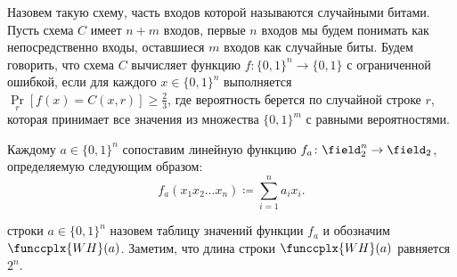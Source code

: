

\setmathstyle{}{}{}
\setcounter{curtask}{95}



\begin{definition*}
    Назовем  такую схему, часть входов которой называются
    случайными битами. Пусть схема $C$ имеет $n + m$ входов, первые $n$ входов мы будем понимать как
    непосредственно входы, оставшиеся $m$ входов как случайные биты. Будем говорить, что схема $C$
    вычисляет функцию $f\colon \{0, 1\}^n \to \{0, 1\}$ с ограниченной ошибкой, если для каждого $x \in
    \{0, 1\}^n$ выполняется $\Pr\limits_{r}[f(x) = C(x, r)] \ge \frac{2}{3}$, где вероятность берется по
    случайной строке $r$, которая принимает все значения из множества $\{0, 1\}^m$ с равными
    вероятностями.
\end{definition*}


\begin{definition*}
    Каждому $a \in \{0, 1\}^n$ сопоставим линейную функцию $f_a\colon \field_2^n \to \field_2$,
    определяемую следующим образом:
    $$
    f_a(x_1 x_2 \dots x_n) \coloneqq \sum\limits_{i = 1}^n a_i x_i.
    $$

     строки $a \in \{0, 1\}^n$ назовем таблицу значений функции $f_a$ и
    обозначим $\funccplx{WH}(a)$. Заметим, что длина строки $\funccplx{WH}(a)$ равняется $2^n$. 
\end{definition*}


\breakline







